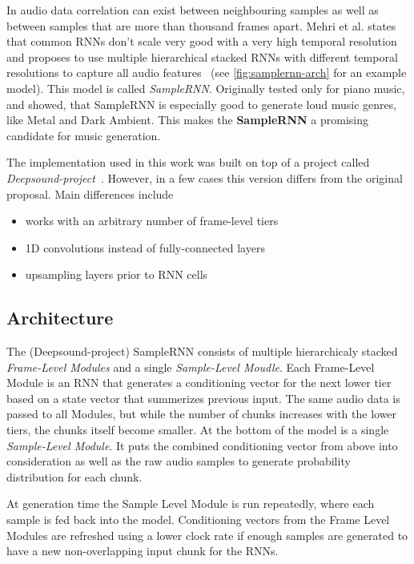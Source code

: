 \documentclass[12pt]{article}
\begin{document}
In audio data correlation can exist between neighbouring samples as well as between samples that are more than thousand frames apart.
Mehri et al. states that common RNNs don't scale very good with a very high temporal resolution and proposes to use multiple hierarchical stacked RNNs with different temporal resolutions to capture all audio features~\cite{mehri2016samplernn} (see \ref{fig:samplernn-arch} for an example model).
This model is called \emph{SampleRNN}.
Originally tested only for piano music, \cite{zukowski2018generating} and \cite{carr2018generating} showed, that SampleRNN is especially good to generate loud music genres, like Metal and Dark Ambient.
This makes the \textbf{SampleRNN} a promising candidate for music generation.

The implementation used in this work was built on top of a project called \emph{Deepsound-project}~\cite{samplernn-git}.
However, in a few cases this version differs from the original proposal.
Main differences include
\begin{itemize}
 \item works with an arbitrary number of frame-level tiers
 \item 1D convolutions instead of fully-connected layers
 \item upsampling layers prior to RNN cells
\end{itemize}



\subsection{Architecture}
The (Deepsound-project) SampleRNN consists of multiple hierarchicaly stacked \emph{Frame-Level Modules} and a single \emph{Sample-Level Moudle}.
Each Frame-Level Module is an RNN that generates a conditioning vector for the next lower tier based on a state vector that summerizes previous input.
The same audio data is passed to all Modules, but while the number of chunks increases with the lower tiers, the chunks itself become smaller.
At the bottom of the model is a single \emph{Sample-Level Module}.
It puts the combined conditioning vector from above into consideration as well as the raw audio samples to generate probability distribution for each chunk.

At generation time the Sample Level Module is run repeatedly, where each sample is fed back into the model.
Conditioning vectors from the Frame Level Modules are refreshed using a lower clock rate if enough samples are generated to have a new non-overlapping input chunk for the RNNs.
\end{document}
